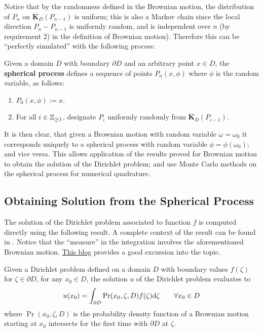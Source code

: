 \documentclass[10pt]{article}
\begin{document}
\textstart
Notice that by the randomness defined in the Brownian motion, the distribution of $P_n$ on $\overline{\bm{K}}_D(P_{n-1})$ is uniform; this is also a Markov chain since the local direction $P_n - P_{n-1}$ is uniformly random, and is independent over $n$ (by requirement 2) in the definition of Brownian motion). Therefore this can be ``perfectly simulated'' with the following process:

\begin{definition}
    Given a domain $D$ with boundary $\partial D$ and an arbitrary point $x \in D$, the \textbf{spherical process} defines a sequence of points $P_n(x, \phi)$ where $\phi$ is the random variable, as follows:
    \begin{enumerate}
        \item $P_0(x, \phi) := x$.
        \item For all $i \in \mathbb{Z}_{\geq 1}$, designate $P_i$ uniformly randomly from $\overline{\bm{K}}_D (P_{i-1})$. 
    \end{enumerate}
\end{definition}

It is then clear, that given a Brownian motion with random variable $\omega = \omega_0$ it corresponds uniquely to a spherical process with random variable $\phi = \phi(\omega_0)$; and vice versa. This allows application of the results proved for Brownian motion to obtain the solution of the Dirichlet problem; and use Monte Carlo methods on the spherical process for numerical quadrature.

\subsection{Obtaining Solution from the Spherical Process}

\textstart
The solution of the Dirichlet problem associated to function $f$ is computed directly using the following result. A complete context of the result can be found in \cite{Kakutani1944}. Notice that the ``measure'' in the integration involves the aforementioned Brownian motion. \hyperlink{https://willierushrush.github.io/posts/2021/08/dirichlet-problem}{This blog} provides a good excursion into the topic. 

\begin{proposition}
    Given a Dirichlet problem defined on a domain $D$ with boundary values $f(\zeta)$ for $\zeta \in \partial D$, for any $x_0 \in D$, the solution $u$ of the Dirichlet problem evaluates to
    \[
        u(x_0) = \int_{\partial D} \mathrm{Pr}(x_0, \zeta, D) f(\zeta) \mathrm{d} \zeta \qquad \forall x_0 \in D
    \]
    where $\Pr(x_0, \zeta, D)$ is the probability density function of a Brownian motion starting at $x_0$ intersects for the first time with $\partial D$ at $\zeta$.
\end{proposition}
\end{document}
